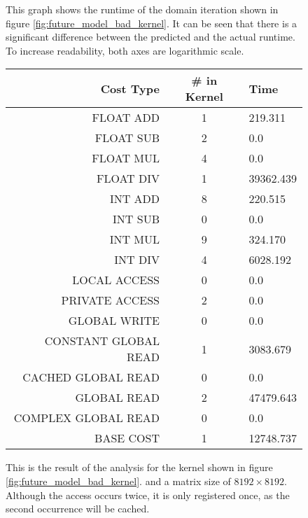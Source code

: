 \begin{figure}
	\begin{center}
		\caption{This graph shows the runtime of the domain iteration shown in figure \ref{fig:future_model_bad_kernel}. It can be seen that there is a significant difference between the predicted and the actual runtime. To increase readability, both axes are logarithmic scale.}
		\label{fig:future_model_bad_result}
	\end{center}
\end{figure}
\newpage

\begin{figure}
	\begin{center}
		\begin{tabular}{r|c|l}
			\textbf{Cost Type} & \textbf{\# in Kernel} & \textbf{Time} \\
			\hline
			FLOAT ADD & 1 &	219.311 \\
			FLOAT SUB & 2 & 0.0 \\
			FLOAT MUL & 4 & 0.0 \\
			FLOAT DIV & 1 & 39362.439 \\
			INT ADD & 8 & 220.515 \\
			INT SUB & 0 & 0.0 \\
			INT MUL & 9 & 324.170 \\
			INT DIV & 4 & 6028.192 \\
			LOCAL ACCESS & 0 & 0.0 \\
			PRIVATE ACCESS & 2 & 0.0 \\
			GLOBAL WRITE & 0 & 0.0 \\
			CONSTANT GLOBAL READ & 1 & 3083.679 \\
			CACHED GLOBAL READ & 0 & 0.0 \\
			GLOBAL READ & 2 & 47479.643 \\
			COMPLEX GLOBAL READ & 0 & 0.0 \\
			BASE COST & 1 & 12748.737\\
			\hline
			
		\end{tabular}
	\end{center}
	\caption{This is the result of the analysis for the kernel shown in figure \ref{fig:future_model_bad_kernel}. and a matrix size of $8192\times 8192$. Although the access  occurs twice, it is only registered once, as the second occurrence will be cached.}
	\label{fig:future_model_bad}
\end{figure}
